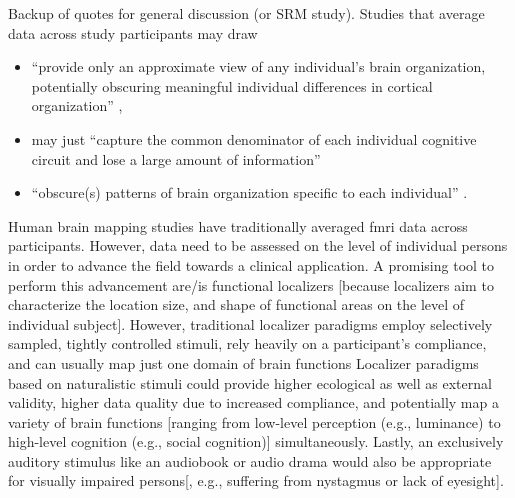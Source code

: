 Backup of quotes for general discussion (or SRM study).  Studies that average
data across study participants may draw

\begin{itemize}

\item ``provide only an approximate view of any individual's brain organization,
    potentially obscuring meaningful individual differences in cortical
        organization'' \citep{laumann2015functional},

\item may just ``capture the common denominator of each individual cognitive
    circuit and lose a large amount of information''

\item ``obscure(s) patterns of brain organization specific to each individual''
    \citep{laumann2015functional}.

\end{itemize}




Human brain mapping studies have traditionally averaged \ac{fmri} data across
participants.
%
However, data need to be assessed on the level of individual persons in order to
advance the field towards a clinical application.
A promising tool to perform this advancement are/is functional localizers
[because localizers aim to characterize the location size, and shape of
functional areas on the level of individual subject].
However, traditional localizer paradigms employ selectively sampled, tightly
controlled stimuli, rely heavily on a participant's compliance, and can usually
map just one domain of brain functions
Localizer paradigms based on naturalistic stimuli could provide higher
ecological as well as external validity, higher data quality due to increased
compliance, and potentially map a variety of brain functions [ranging from
low-level perception (e.g., luminance) to high-level cognition (e.g., social
cognition)] simultaneously.
Lastly, an exclusively auditory stimulus like an audiobook or audio drama would
also be appropriate for visually impaired persons[, e.g., suffering from
nystagmus or lack of eyesight].


